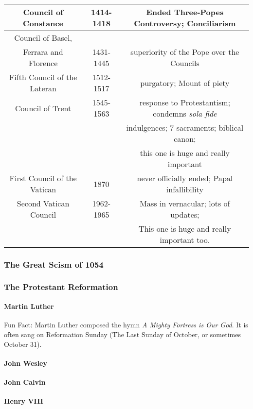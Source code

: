 \begin{tabular}{|c|c|c|}
					 Council of Constance & 1414-1418 & Ended Three-Popes Controversy; Conciliarism \\
					 \hline
					 Council of Basel,  & & \\ 
					 Ferrara and Florence &  1431-1445 & superiority of the Pope over the Councils \\
					 \hline
					Fifth Council of the Lateran &1512-1517 & purgatory; Mount of piety \\
					\hline
					Council of Trent & 1545-1563 & response to Protestantism; condemns \textit{sola fide}\\
					& & indulgences; 7 sacraments; biblical canon; \\
					& & this one is huge and really important \\
					\hline
					First Council of the Vatican & 1870&  never officially ended; Papal infallibility \\
					\hline
					Second Vatican Council & 1962-1965 & Mass in vernacular; lots of updates; 
					\\
					 & & This one is huge and really important too. \\
					 \hline
									 
					  
					
				\end{tabular}
				
			
			\newpage	
			\subsubsection{The Great Scism of 1054}
			\subsubsection{The Protestant Reformation}
				\paragraph{Martin Luther} \label{MartinLuther}
					Fun Fact: Martin Luther composed the hymn \textit{A Mighty Fortress is Our God}.  It is often sang on Reformation Sunday (The Last Sunday of October, or sometimes October 31).
				\paragraph{John Wesley}
				\paragraph{John Calvin}
				\paragraph{Henry VIII}
				
